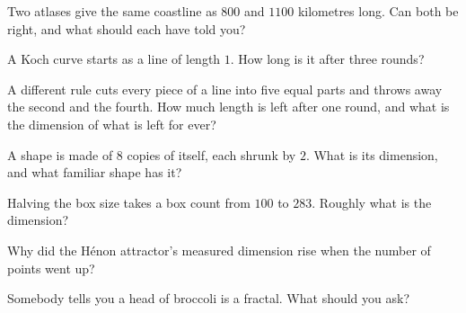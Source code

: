 \begin{checkpoint}
\item Two atlases give the same coastline as $800$ and $1100$ kilometres long.
  Can both be right, and what should each have told you?
\item A Koch curve starts as a line of length $1$. How long is it after three
  rounds?
\item A different rule cuts every piece of a line into five equal parts and
  throws away the second and the fourth. How much length is left after one
  round, and what is the dimension of what is left for ever?
\item A shape is made of $8$ copies of itself, each shrunk by $2$. What is its
  dimension, and what familiar shape has it?
\item Halving the box size takes a box count from $100$ to $283$. Roughly what
  is the dimension?
\item Why did the Hénon attractor's measured dimension rise when the number of
  points went up?
\item Somebody tells you a head of broccoli is a fractal. What should you ask?
\end{checkpoint}

